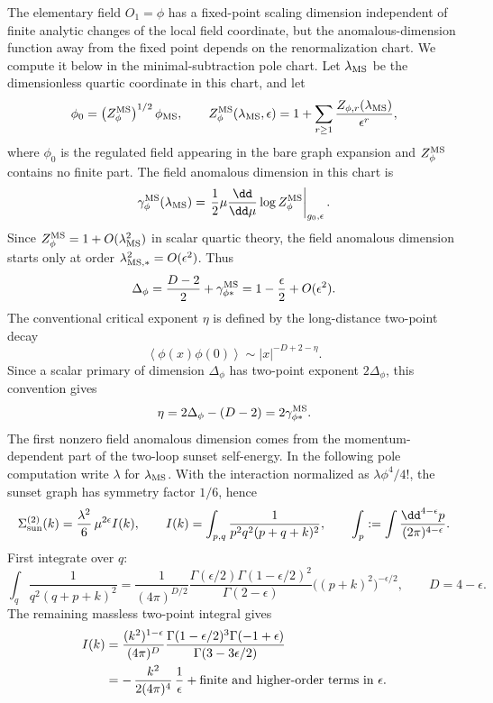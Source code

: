 The elementary field \(O_1=\phi\) has a fixed-point scaling dimension
independent of finite analytic changes of the local field coordinate, but the
anomalous-dimension function away from the fixed point depends on the
renormalization chart.  We compute it below in the minimal-subtraction pole
chart.  Let \(\lambda_{\rm MS}\) be the dimensionless quartic coordinate in
this chart, and let
\[
  \phi_0=\left(Z_\phi^{\rm MS}\right)^{1/2}\phi_{\rm MS},
  \qquad
  Z_\phi^{\rm MS}(\lambda_{\rm MS},\epsilon)
  =
  1+\sum_{r\geq 1}\frac{Z_{\phi,r}(\lambda_{\rm MS})}{\epsilon^r},
\]
where \(\phi_0\) is the regulated field appearing in the bare graph expansion
and \(Z_\phi^{\rm MS}\) contains no finite part.  The field anomalous dimension
in this chart is
\[
  \gamma_\phi^{\rm MS}(\lambda_{\rm MS})
  =
  \left.
  \frac12\mu\frac{\dd}{\dd\mu}\log Z_\phi^{\rm MS}
  \right|_{g_0,\epsilon}.
\]
Since \(Z_\phi^{\rm MS}=1+O(\lambda_{\rm MS}^2)\) in scalar quartic theory, the
field anomalous dimension starts only at order
\(\lambda_{{\rm MS},*}^2=O(\epsilon^2)\).  Thus
\[
  \Delta_\phi
  =
  \frac{D-2}{2}+\gamma_{\phi*}^{\rm MS}
  =
  1-\frac{\epsilon}{2}+O(\epsilon^2).
\]
The conventional critical exponent \(\eta\) is defined by the long-distance
two-point decay
\[
  \left\langle\phi(x)\phi(0)\right\rangle
  \sim
  |x|^{-D+2-\eta}.
\]
Since a scalar primary of dimension \(\Delta_\phi\) has two-point exponent
\(2\Delta_\phi\), this convention gives
\[
  \eta=2\Delta_\phi-(D-2)=2\gamma_{\phi *}^{\rm MS}.
\]
The first nonzero field anomalous dimension comes from the momentum-dependent
part of the two-loop sunset self-energy.  In the following pole computation
write \(\lambda\) for \(\lambda_{\rm MS}\).  With the interaction normalized as
\(\lambda\phi^4/4!\), the sunset graph has symmetry factor \(1/6\), hence
\[
  \Sigma_{\rm sun}^{(2)}(k)
  =
  \frac{\lambda^2}{6}\,\mu^{2\epsilon} I(k),
  \qquad
  I(k)=
  \int_{p,q}
  \frac{1}{p^2q^2(p+q+k)^2},
  \qquad
  \int_p:=\int\frac{\dd^{4-\epsilon}p}{(2\pi)^{4-\epsilon}} .
\]
First integrate over \(q\):
\[
  \int_q\frac{1}{q^2(q+p+k)^2}
  =
  \frac{1}{(4\pi)^{D/2}}
  \frac{\Gamma(\epsilon/2)\Gamma(1-\epsilon/2)^2}{\Gamma(2-\epsilon)}
  \bigl((p+k)^2\bigr)^{-\epsilon/2},
  \qquad D=4-\epsilon .
\]
The remaining massless two-point integral gives
\[
\begin{aligned}
  I(k)
  &=
  \frac{(k^2)^{1-\epsilon}}{(4\pi)^D}
  \frac{\Gamma(1-\epsilon/2)^3\Gamma(-1+\epsilon)}
       {\Gamma(3-3\epsilon/2)}
  \\
  &=
  -\,\frac{k^2}{2(4\pi)^4}\,\frac1\epsilon
  + \hbox{finite and higher-order terms in }\epsilon .
\end{aligned}
\]
